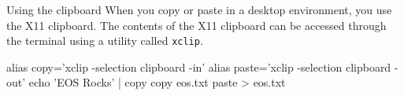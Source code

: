 \begin{block}{Using the clipboard}
  When you copy or paste in a desktop environment, you use the X11 clipboard. The contents of the X11 clipboard can be accessed through the terminal using a utility called \texttt{xclip}.
  \begin{indented}
    \begin{bashcode}
      alias copy='xclip -selection clipboard -in'
      alias paste='xclip -selection clipboard -out'
      echo 'EOS Rocks' | copy
      copy eos.txt
      paste > eos.txt
    \end{bashcode}
  \end{indented}
\end{block}

